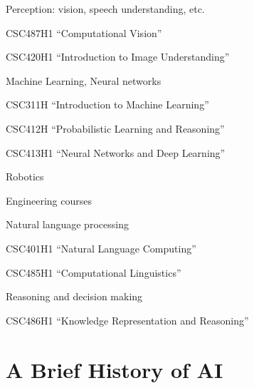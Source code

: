 \begin{listu}
    \item Perception: vision, speech understanding, etc.
    \begin{listu}
        \item CSC487H1 ``Computational Vision''
        \item CSC420H1 ``Introduction to Image Understanding''
    \end{listu}

    \item Machine Learning, Neural networks
    \begin{listu}
        \item CSC311H ``Introduction to Machine Learning''
        \item CSC412H ``Probabilistic Learning and Reasoning''
        \item CSC413H1 ``Neural Networks and Deep Learning''
    \end{listu}

    \item Robotics
    \begin{listu}
        \item Engineering courses
    \end{listu}

    \item Natural language processing
    \begin{listu}
        \item CSC401H1 ``Natural Language Computing''
        \item CSC485H1 ``Computational Linguistics''
    \end{listu}

    \item Reasoning and decision making
    \begin{listu}
        \item CSC486H1 ``Knowledge Representation and Reasoning''
    \end{listu}
\end{listu}

\section{A Brief History of AI}

